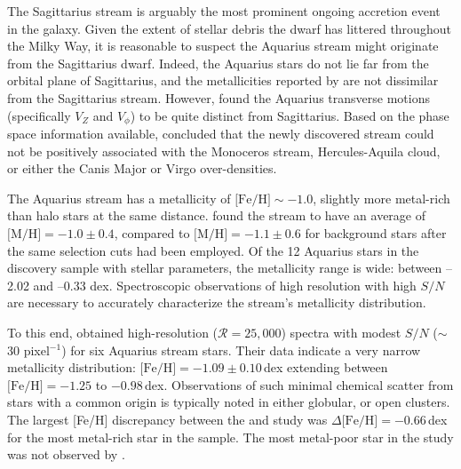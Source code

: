 \documentclass{emulateapj}
\begin{document}



The Sagittarius stream is arguably the most prominent ongoing accretion event in the galaxy. Given the extent of stellar debris the dwarf has littered throughout the Milky Way, it is reasonable to suspect the Aquarius stream might originate from the Sagittarius dwarf. Indeed, the Aquarius  stars do not lie far from the orbital plane of Sagittarius, and the metallicities reported by \citet{williams;et-al_2011} are not dissimilar from the Sagittarius stream. However, \citet{williams;et-al_2011} found the Aquarius transverse motions (specifically $V_{Z}$ and $V_\phi$) to be quite distinct from Sagittarius. Based on the phase space information available, \citet{williams;et-al_2011} concluded that the newly discovered stream could not be positively associated with the Monoceros stream, Hercules-Aquila cloud, or either the Canis Major or Virgo over-densities. 

The Aquarius stream has a metallicity of $\mbox{[Fe/H]} \sim -1.0$, slightly more metal-rich than halo stars at the same distance. \citet{williams;et-al_2011} found the stream to have an average of $\mbox{[M/H]} = -1.0 \pm 0.4$, compared to $\mbox{[M/H]} = -1.1 \pm 0.6$ for background stars after the same selection cuts had been employed. Of the 12 Aquarius stars in the \citet{williams;et-al_2011} discovery sample with stellar parameters, the metallicity range is wide: between --2.02 and --0.33 dex. Spectroscopic observations of high resolution with high $S/N$ are necessary to accurately characterize the stream's metallicity distribution.

To this end, \citet{wylie-de-boer;et-al_2012} obtained high-resolution ($\mathcal{R} = 25,000$) spectra with modest $S/N$ ($\sim$30 pixel$^{-1}$) for six Aquarius stream stars. Their data indicate a very narrow metallicity distribution: $\mbox{[Fe/H]} = -1.09 \pm 0.10$\,dex extending between $\mbox{[Fe/H]} = -1.25$ to $-0.98$\,dex. Observations of such minimal chemical scatter from stars with a common origin is typically noted in either globular, or open clusters. The largest [Fe/H] discrepancy between the \citet{williams;et-al_2011} and \citet{wylie-de-boer;et-al_2012} study was $\Delta\mbox{[Fe/H]} = -0.66$\,dex for the most metal-rich star in the \citet{williams;et-al_2011} sample. The most metal-poor star in the \citet{williams;et-al_2011} study was not observed by \citet{wylie-de-boer;et-al_2012}. 
\end{document}
